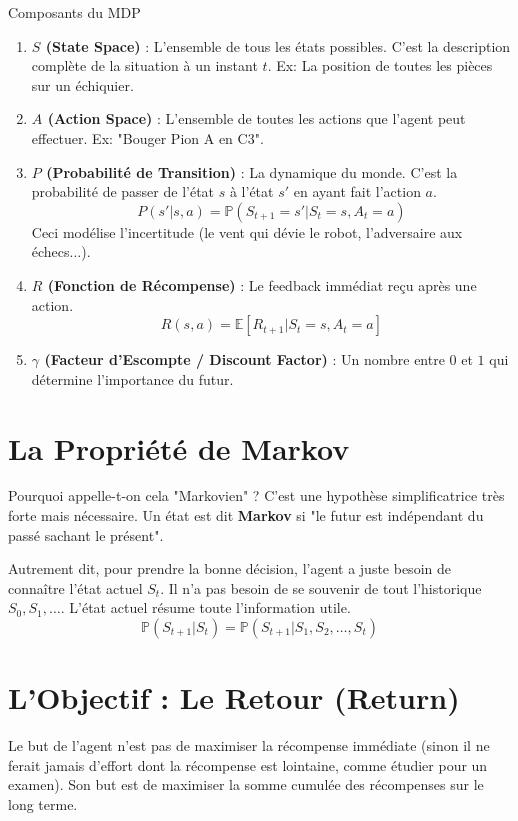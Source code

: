 \documentclass[a4paper,12pt]{report}
\begin{document}
\begin{mathdef}{Composants du MDP}
\begin{enumerate}
    \item \textbf{$S$ (State Space)} : L'ensemble de tous les états possibles. C'est la description complète de la situation à un instant $t$. Ex: La position de toutes les pièces sur un échiquier.
    \item \textbf{$A$ (Action Space)} : L'ensemble de toutes les actions que l'agent peut effectuer. Ex: "Bouger Pion A en C3".
    \item \textbf{$P$ (Probabilité de Transition)} : La dynamique du monde. C'est la probabilité de passer de l'état $s$ à l'état $s'$ en ayant fait l'action $a$.
    \[ P(s'|s,a) = \mathbb{P}(S_{t+1}=s' | S_t=s, A_t=a) \]
    Ceci modélise l'incertitude (le vent qui dévie le robot, l'adversaire aux échecs...).
    \item \textbf{$R$ (Fonction de Récompense)} : Le feedback immédiat reçu après une action.
    \[ R(s,a) = \mathbb{E}[R_{t+1} | S_t=s, A_t=a] \]
    \item \textbf{$\gamma$ (Facteur d'Escompte / Discount Factor)} : Un nombre entre $0$ et $1$ qui détermine l'importance du futur.
\end{enumerate}
\end{mathdef}

\section{La Propriété de Markov}
Pourquoi appelle-t-on cela "Markovien" ? C'est une hypothèse simplificatrice très forte mais nécessaire.
Un état est dit \textbf{Markov} si "le futur est indépendant du passé sachant le présent".

Autrement dit, pour prendre la bonne décision, l'agent a juste besoin de connaître l'état actuel $S_t$. Il n'a pas besoin de se souvenir de tout l'historique $S_0, S_1, \dots$. L'état actuel résume toute l'information utile.
\[ \mathbb{P}(S_{t+1} | S_t) = \mathbb{P}(S_{t+1} | S_1, S_2, \dots, S_t) \]

\section{L'Objectif : Le Retour (Return)}
Le but de l'agent n'est pas de maximiser la récompense immédiate (sinon il ne ferait jamais d'effort dont la récompense est lointaine, comme étudier pour un examen). Son but est de maximiser la somme cumulée des récompenses sur le long terme.
\end{document}
